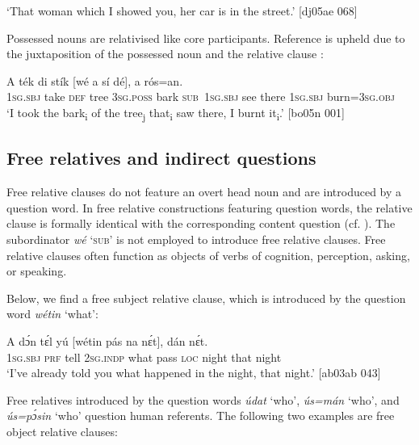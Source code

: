 \glt ‘That woman which I showed you, her car is in the street.’ [dj05ae 068]
\z

Possessed nouns are relativised like core participants. Reference is upheld due to the juxtaposition of the possessed noun and the relative clause :


\ea%
    \label{ex:key:1449}
    \gll \MakeUppercase{A}   ték    di  stík          [wé  a    sí  dé],
a    rós=an.\\
\textsc{1sg.sbj} take \textsc{def} tree    \textsc{3sg.poss} bark  \textsc{sub}\ \textsc{1sg.sbj} see there 
\textsc{1sg.sbj}  burn=\textsc{3sg.obj}\\

\glt ‘I took the bark\textsubscript{i} of the tree\textsubscript{j} that\textsubscript{i} saw there, I burnt it\textsubscript{i}.’ [bo05n 001]
\z

\subsection{Free relatives and indirect questions}\label{sec:10.6.5}

Free relative clauses do not feature an overt head noun and are introduced by a question word. In free relative constructions featuring question words, the relative clause is formally identical with the corresponding content question (cf. ). The subordinator \textit{wé} ‘\textsc{sub’} is not employed to introduce free relative clauses. Free relative clauses often function as objects of verbs of cognition, perception, asking, or speaking. 


Below, we find a free subject relative clause, which is introduced by the question word \textit{wétin} ‘what’:



\ea%
    \label{ex:key:1450}
    \gll A    dɔ́n    tɛ́l  yú    [wétin  pás    na  nɛ́t],    dán    nɛ́t.\\
\textsc{1sg.sbj}  \textsc{prf}    tell  \textsc{2sg.indp}   what  pass    \textsc{loc}  night  that    night\\

\glt ‘I’ve already told you what happened in the night, that night.’ [ab03ab 043]
\z

Free relatives introduced by the question words \textit{údat} ‘who’, \textit{ús=mán} ‘who’, and \textit{ús=pɔ́sin} ‘who’ question human referents. The following two examples are free object relative clauses:


